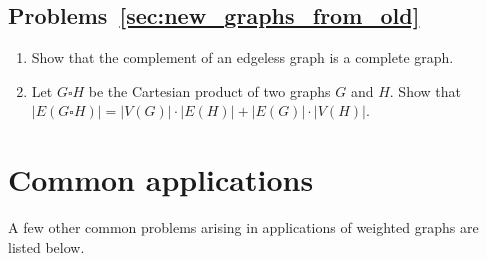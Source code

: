 
\subsection*{Problems~\ref{sec:new_graphs_from_old}}

\begin{enumerate}
\item Show that the complement of an edgeless graph is a complete
  graph.

\item Let $G \square H$ be the Cartesian product of two graphs $G$ and
  $H$. Show that
  $|E(G \square H)| = |V(G)| \cdot |E(H)| + |E(G)| \cdot |V(H)|$.
\end{enumerate}



\section{Common applications}

A few other common problems arising in applications of weighted graphs
are listed below.

